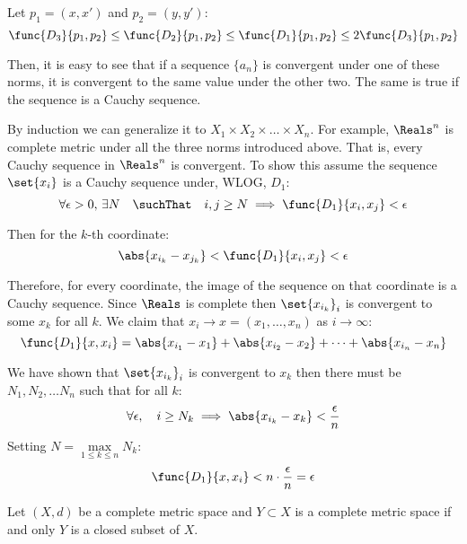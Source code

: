 Let \(p_1 = (x,x')\) and \(p_2 = (y,y')\):
\begin{equation*}
    \func{D_3}{p_1,p_2} \leq \func{D_2}{p_1,p_2} \leq \func{D_1}{p_1,p_2} \leq 2\func{D_3}{p_1,p_2}
\end{equation*}

Then, it is easy to see that if a sequence \(\{ a_n \}\) is convergent under one of these norms, it is convergent to the same value under the other two.
The same is true if the sequence is a Cauchy sequence.

By induction we can generalize it to \(X_1 \times X_2 \times \dots \times X_n\). For example, \(\Reals^n\) is complete metric under all the three norms introduced above. That is, every Cauchy sequence in \(\Reals^n\) is convergent. To show this assume the sequence \(\set{ x_i }\) is a Cauchy sequence under, WLOG, \(D_1\):
\begin{equation*}
    \forall \epsilon > 0, \, \exists N \quad \suchThat \quad i,j \geq N \implies \func{D_1}{x_i,x_j} < \epsilon
\end{equation*}

Then for the \(k\)-th coordinate:
\begin{equation*}
    \abs{x_{i_k} - x_{j_k}}  < \func{D_1}{x_i,x_j}  < \epsilon
\end{equation*}

Therefore, for every coordinate, the image of the sequence on that coordinate is a Cauchy sequence. Since \(\Reals\) is complete then \(\set{ x_{i_k} } _i\) is convergent to some \(x_k\) for all \(k\). We claim that \(x_i \to x = (x_1, \dots, x_n)\) as \(i \to \infty\):
\begin{equation*}
    \func{D_1}{x,x_i} = \abs{x_{i_1} - x_1} + \abs{x_{i_2} - x_2}  + \dots + \abs{x_{i_n} - x_n}
\end{equation*}

We have shown that \(\set{ x_{i_k}} _i\) is convergent to \(x_k\) then there must be \(N_1,N_2, \dots N_n\) such that for all \(k\):
\begin{equation*}
    \forall \epsilon,\quad i \geq N_k \implies \abs{x_{i_k} - x_k} < \frac{\epsilon}{n}
\end{equation*}
Setting \( N = \underset{1 \leq k \leq n}{\max}{N_k} \):
\begin{equation*}
    \func{D_1}{x,x_i} < n \cdot \frac{\epsilon}{n} = \epsilon
\end{equation*}

\begin{theorem}
    Let \((X,d)\) be a complete metric space and \(Y \subset X\) is a complete metric space if and only \(Y\) is a closed subset of \(X\).
\end{theorem}

